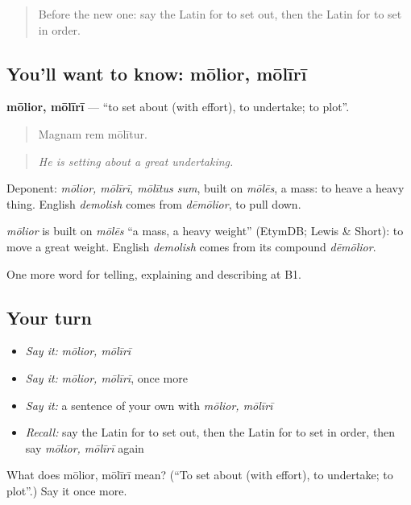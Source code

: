 \begin{quote}
Before the new one: say the Latin for to set out, then the Latin for to set in order.
\end{quote}

\subsection*{You'll want to know: mōlior, mōlīrī}
\textbf{mōlior, mōlīrī} — \textquotedblleft{}to set about (with effort), to undertake; to plot\textquotedblright{}.

\begin{quote}
Magnam rem mōlītur.
\end{quote}

\begin{quote}
\emph{He is setting about a great undertaking.}
\end{quote}

Deponent: \emph{mōlior, mōlīrī, mōlītus sum}, built on \emph{mōlēs}, a mass: to heave a heavy thing. English \emph{demolish} comes from \emph{dēmōlior}, to pull down.

\begin{cousinweb}
\emph{mōlior} is built on \emph{mōlēs} \textquotedblleft{}a mass, a heavy weight\textquotedblright{} (EtymDB; Lewis \& Short): to move a great weight. English \emph{demolish} comes from its compound \emph{dēmōlior}.
\end{cousinweb}

\begin{grammarlens}[title={What you've built}]
One more word for telling, explaining and describing at B1.
\end{grammarlens}

\subsection*{Your turn}
\begin{itemize}
\raggedright
  \item \emph{Say it:} \emph{mōlior, mōlīrī}
  \item \emph{Say it:} \emph{mōlior, mōlīrī}, once more
  \item \emph{Say it:} a sentence of your own with \emph{mōlior, mōlīrī}
  \item \emph{Recall:} say the Latin for to set out, then the Latin for to set in order, then say \emph{mōlior, mōlīrī} again
\end{itemize}

\begin{tcolorbox}[breakable,colback=teal!4,colframe=teal!35!black,title={Before you move on}]
What does mōlior, mōlīrī mean? (\textquotedblleft{}To set about (with effort), to undertake; to plot\textquotedblright{}.) Say it once more.
\end{tcolorbox}
